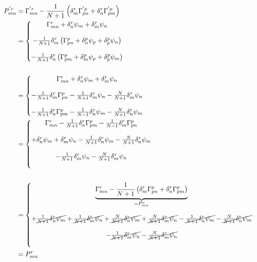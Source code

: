 \begin{align*}
P^{'r}_{mn} &= \Gamma ^{'r}_{mn}-\frac{1}{N+1}\left(\delta^r_m \Gamma^{'p}_{pn}+  \delta^r_n \Gamma^{'p}_{pm} \right)\\
&=\left\{\begin{matrix}
 \Gamma^{r}_{mn} +\delta^r_n\psi_m +\delta^r_m\psi_n\\\\
 -\frac{1}{N+1}\delta^r_m \left(\Gamma^{p}_{pn} +\delta^p_n\psi_p +\delta^p_p\psi_n\right)\\\\
 -\frac{1}{N+1}  \delta^r_n \left(\Gamma^{p}_{pm} +\delta^p_m\psi_p +\delta^p_p\psi_m \right)\\
\end{matrix}\right.\\\\
&=\left\{\begin{matrix}
 \Gamma^{r}_{mn} +\delta^r_n\psi_m +\delta^r_m\psi_n\\\\
 -\frac{1}{N+1}\delta^r_m \Gamma^{p}_{pn} -\frac{1}{N+1}\delta^r_m \psi_n -\frac{N}{N+1}\delta^r_m \psi_n\\\\
 -\frac{1}{N+1}  \delta^r_n \Gamma^{p}_{pm} -\frac{1}{N-1}  \delta^r_n \psi_m -\frac{N}{N+1}  \delta^r_n \psi_m \\
\end{matrix}\right.\\
&=\left\{\begin{matrix}
 \Gamma^{r}_{mn} -\frac{1}{N+1}  \delta^r_n \Gamma^{p}_{pm}-\frac{1}{N-1}\delta^r_m \Gamma^{p}_{pn}\\\\
 +\delta^r_n\psi_m +\delta^r_m\psi_n -\frac{1}{N+1}  \delta^r_n \psi_m -\frac{N}{N+1}  \delta^r_n \psi_m \\\\
 -\frac{1}{N+1}\delta^r_m \psi_n -\frac{N}{N+1}\delta^r_m \psi_n\\\\
\end{matrix}\right.\\\\
&=\left\{\begin{matrix}
 \underbrace{\Gamma^{r}_{mn} -\frac{1}{N+1} \left( \delta^r_m \Gamma^{p}_{pn}+\delta^r_n \Gamma^{p}_{pm}\right)}_{=P^{r}_{mn}  }\\\\
 +\cancel{\frac{1}{N+1}\delta^r_n\psi_m }+\cancel{\frac{1}{N+1}\delta^r_m\psi_n} +\cancel{\frac{N}{N+1}\delta^r_n\psi_m} +\cancel{\frac{N}{N+1}\delta^r_m\psi_n}-\cancel{\frac{1}{N+1}  \delta^r_n \psi_m} -\cancel{\frac{N}{N+1}  \delta^r_n \psi_m }\\\\
 -\cancel{\frac{1}{N+1}\delta^r_m \psi_n} -\cancel{\frac{N}{N+1}\delta^r_m \psi_n}\\\\
\end{matrix}\right.\\
&= P^{r}_{mn}
\end{align*}
